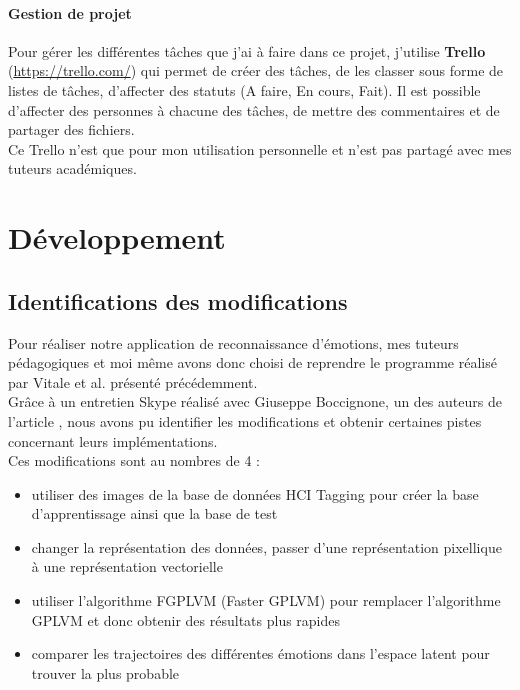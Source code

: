 \documentclass[poster]{polytech/polytech}
\begin{document}
\subsection{Gestion de projet}
Pour gérer les différentes tâches que j'ai à faire dans ce projet, j'utilise \textbf{Trello} (\url{https://trello.com/}) qui permet de créer des tâches, de les classer sous forme de listes de tâches, d'affecter des statuts (A faire, En cours, Fait). Il est possible d'affecter des personnes à chacune des tâches, de mettre des commentaires et de partager des fichiers.\\
Ce Trello n'est que pour mon utilisation personnelle et n'est pas partagé avec mes tuteurs académiques.


\part{Développement}
\label{part:part_dev}

\chapter{Identifications des modifications}
Pour réaliser notre application de reconnaissance d'émotions, mes tuteurs pédagogiques et moi même avons donc choisi de reprendre le programme réalisé par Vitale et al. présenté précédemment.\\
Grâce à un entretien Skype réalisé avec Giuseppe Boccignone, un des auteurs de l'article \cite{italiens}, nous avons pu identifier les modifications et obtenir certaines pistes concernant leurs implémentations.\\
Ces modifications sont au nombres de 4 :
\begin{itemize}
\item utiliser des images de la base de données HCI Tagging pour créer la base d'apprentissage ainsi que la base de test
\item changer la représentation des données, passer d'une représentation pixellique à une représentation vectorielle
\item utiliser l'algorithme FGPLVM (Faster GPLVM) pour remplacer l'algorithme GPLVM et donc obtenir des résultats plus rapides
\item comparer les trajectoires des différentes émotions dans l'espace latent pour trouver la plus probable\\
\end{itemize}
\end{document}
